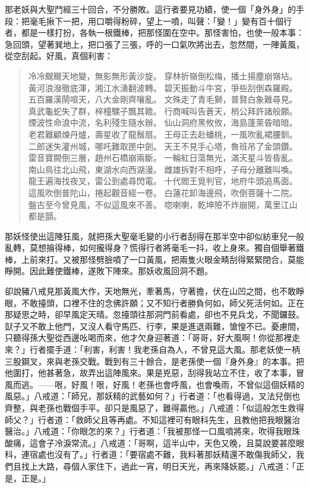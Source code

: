 那老妖與大聖鬥經三十回合，不分勝敗。這行者要見功績，使一個「身外身」的手段：把毫毛揪下一把，用口嚼得粉碎，望上一噴，叫聲：「變！」變有百十個行者，都是一樣打扮，各執一根鐵棒，把那怪圍在空中。那怪害怕，也使一般本事：急回頭，望著巽地上，把口張了三張，呼的一口氣吹將出去，忽然間，一陣黃風，從空刮起。好風，真個利害：
\begin{quote}
冷冷颼颼天地變，無影無形黃沙旋。
穿林折嶺倒松梅，播土揚塵崩嶺坫。
黃河浪潑徹底渾，湘江水湧翻波轉。
碧天振動斗牛宮，爭些刮倒森羅殿。
五百羅漢鬧喧天，八大金剛齊嚷亂。
文殊走了青毛獅，普賢白象難尋見。
真武龜蛇失了群，梓橦騾子飄其韂。
行商喊叫告蒼天，梢公拜許諸般願。
煙波性命浪中流，名利殘生隨水辦。
仙山洞府黑攸攸，海島蓬萊昏暗暗。
老君難顧煉丹爐，壽星收了龍鬚扇。
王母正去赴蟠桃，一風吹亂裙腰釧。
二郎迷失灌州城，哪吒難取匣中劍。
天王不見手心塔，魯班吊了金頭鑽。
雷音寶闕倒三層，趙州石橋崩兩斷。
一輪紅日蕩無光，滿天星斗皆昏亂。
南山鳥往北山飛，東湖水向西湖漫。
雌雄拆對不相呼，子母分離難叫喚。
龍王遍海找夜叉，雷公到處尋閃電。
十代閻王覓判官，地府牛頭追馬面。
這風吹倒普陀山，捲起觀音經一卷。
白蓮花卸海邊飛，吹倒菩薩十二院。
盤古至今曾見風，不似這風來不善。
唿喇喇，乾坤險不炸崩開，萬里江山都是顫。
\end{quote}

那妖怪使出這陣狂風，就把孫大聖毫毛變的小行者刮得在那半空中卻似紡車兒一般亂轉，莫想掄得棒，如何攏得身？慌得行者將毫毛一抖，收上身來。獨自個舉著鐵棒，上前來打。又被那怪劈臉噴了一口黃風，把兩隻火眼金睛刮得緊緊閉合，莫能睜開。因此難使鐵棒，遂敗下陣來。那妖收風回洞不題。

卻說豬八戒見那黃風大作，天地無光，牽著馬，守著擔，伏在山凹之間，也不敢睜眼，不敢擡頭，口裡不住的念佛許願；又不知行者勝負何如，師父死活何如。正在那疑思之時，卻早風定天晴。忽擡頭往那洞門前看處，卻也不見兵戈，不聞鑼鼓。獃子又不敢上他門，又沒人看守馬匹、行李，果是進退兩難，愴惶不已。憂慮間，只聽得孫大聖從西邊吆喝而來，他才欠身迎著道：「哥哥，好大風啊！你從那裡走來？」行者擺手道：「利害，利害！我老孫自為人，不曾見這大風。那老妖使一柄三股鋼叉，來與老孫交戰。戰到有三十餘合，是老孫使一個『身外身』的本事。把他圍打，他甚著急，故弄出這陣風來。果是兇惡，刮得我站立不住，收了本事，冒風而逃。——哏，好風！哏，好風！老孫也會呼風，也會喚雨，不曾似這個妖精的風惡。」八戒道：「師兄，那妖精的武藝如何？」行者道：「也看得過，叉法兒倒也齊整，與老孫也戰個手平。卻只是風惡了，難得贏他。」八戒道：「似這般怎生救得師父？」行者道：「救師父且等再處。不知這裡可有眼科先生，且教他把我眼醫治醫治。」八戒道：「你眼怎的來？」行者道：「我被那怪一口風噴將來，吹得我眼珠酸痛，這會子冷淚常流。」八戒道：「哥啊，這半山中，天色又晚，且莫說要甚麼眼科，連宿處也沒有了。」行者道：「要宿處不難，我料著那妖精還不敢傷我師父，我們且找上大路，尋個人家住下，過此一宵，明日天光，再來降妖罷。」八戒道：「正是，正是。」

